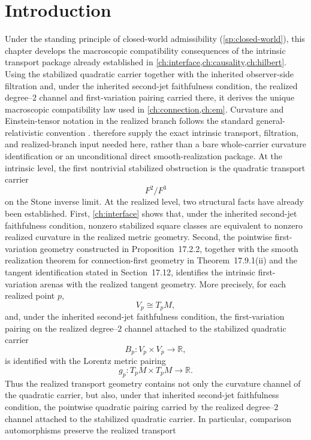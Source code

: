 \section{Introduction}
Under the standing principle of closed-world admissibility
(\cref{sp:closed-world}), this chapter develops the macroscopic
compatibility consequences of the intrinsic transport package
already established in \cref{ch:interface,ch:causality,ch:hilbert}.
Using the stabilized quadratic carrier together with the inherited
observer-side filtration and, under the inherited second-jet
faithfulness condition, the realized degree--\(2\) channel and
first-variation pairing carried there, it derives the unique
macroscopic compatibility law used in \cref{ch:connection,ch:em}.
Curvature and Einstein-tensor notation in the realized branch follows
the standard general-relativistic convention \cite{Wald1984}.
 therefore supply the
exact intrinsic transport, filtration, and realized-branch input
needed here, rather than a bare whole-carrier curvature
identification or an unconditional direct smooth-realization
package.
At the intrinsic level, the first nontrivial stabilized obstruction is
the quadratic transport carrier
\[
	F^2/F^3
\]
on the Stone inverse limit.
At the realized level, two structural facts have already been established.
First, \cref{ch:interface} shows that, under the inherited
second-jet faithfulness condition, nonzero stabilized square classes
are equivalent to nonzero realized curvature in the realized metric
geometry.
Second, the pointwise first-variation geometry constructed in
Proposition~17.2.2, together with the smooth realization theorem for
connection-first geometry in Theorem~17.9.1(ii) and the tangent
identification stated in Section~17.12, identifies the intrinsic
first-variation arenas with the realized tangent geometry.  More
precisely, for each realized point \(p\),
\[
	V_p \cong T_pM,
\]
and, under the inherited second-jet faithfulness condition, the
first-variation pairing on the realized degree--\(2\) channel
attached to the stabilized quadratic carrier
\[
	B_p:V_p\times V_p\to\mathbb R,
\]
is identified with the Lorentz metric pairing
\[
	g_p:T_pM\times T_pM\to\mathbb R.
\]
Thus the realized transport geometry contains not only the curvature
channel of the quadratic carrier, but also, under that inherited
second-jet faithfulness condition, the pointwise quadratic pairing
carried by the realized degree--\(2\) channel attached to the
stabilized quadratic carrier.
In particular, comparison automorphisms preserve the realized transport
